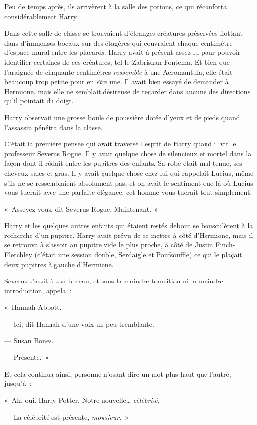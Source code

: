 Peu de temps après, ils arrivèrent à la salle des potions, ce qui réconforta considérablement Harry.

Dans cette salle de classe se trouvaient d'étranges créatures préservées flottant dans d'immenses bocaux sur des étagères qui couvraient chaque centimètre d'espace mural entre les placards.
Harry avait à présent assez lu pour pouvoir identifier certaines de ces créatures, tel le Zabriskan Fontema.
Et bien que l'araignée de cinquante centimètres \emph{ressemble} à une Acromantula, elle était beaucoup trop petite pour en \emph{être} une.
Il avait bien essayé de demander à Hermione, mais elle ne semblait désireuse de regarder dans aucune des directions qu'il pointait du doigt.

Harry observait une grosse boule de poussière dotée d'yeux et de pieds quand l'assassin pénétra dans la classe.

C'était la première pensée qui avait traversé l'esprit de Harry quand il vit le professeur Severus Rogue.
Il y avait quelque chose de silencieux et mortel dans la façon dont il rôdait entre les pupitres des enfants.
Sa robe était mal tenue, ses cheveux sales et gras.
Il y avait quelque chose chez lui qui rappelait Lucius, même s'ils ne se ressemblaient absolument pas, et on avait le sentiment que là où Lucius vous tuerait avec une parfaite élégance, cet homme vous tuerait tout simplement.

«~Asseyez-vous, dit Severus Rogue. Maintenant.~»

Harry et les quelques autres enfants qui étaient restés debout se bousculèrent à la recherche d'un pupitre.
Harry avait prévu de se mettre à côté d'Hermione, mais il se retrouva à s'assoir au pupitre vide le plus proche, à côté de Justin Finch-Fletchley (c'était une session double, Serdaigle et Poufsouffle) ce qui le plaçait deux pupitres à gauche d'Hermione.

Severus s'assit à son bureau, et sans la moindre transition ni la moindre introduction, appela~:

«~Hannah Abbott.

--- Ici, dit Hannah d'une voix un peu tremblante.

--- Susan Bones.

--- Présente.~»

Et cela continua ainsi, personne n'osant dire un mot plus haut que l'autre, jusqu'à~:

«~Ah, oui. Harry Potter. Notre nouvelle… \emph{célébrité}.

--- La célébrité est présente, \emph{monsieur}.~»

